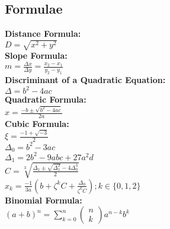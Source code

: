 \documentclass[12pt]{article}
\begin{document}
\subsection*{Formulae}
\textbf{Distance Formula:}
    \\ \( D = \sqrt{ x^2 + y^2 } \)
\\ \textbf{Slope Formula:}
    \\ \( m = \displaystyle\frac{ \Delta x }{ \Delta y } = \displaystyle\frac{ x_2 - x_1 }{ y_2 - y_1 } \)
\\ \textbf{Discriminant of a Quadratic Equation:}
    \\ \( \Delta = b^2 - 4ac \)
\\ \textbf{Quadratic Formula:}
    \\ \( x = \displaystyle\frac{ -b \pm \sqrt{ b^2 - 4ac } }{ 2a } \)
\\ \textbf{Cubic Formula:}
    \\ \( \xi = \displaystyle\frac{ -1 + \sqrt{ -3 } }{ 2 } \)
    \\ \( \Delta_0 = b^2 - 3ac  \)
    \\ \( \Delta_1 = 2b^2 - 9abc + 27 a^2 d \)
    \\ \( C = \sqrt[3]{ \displaystyle\frac{ \Delta_1 \pm \sqrt{ \Delta_1^2 } -4 \Delta_0^3 }{ 2 } } \)
    \\ \( x_k = \displaystyle\frac{ -1 }{ 3a } \left(  b + \zeta^kC + \displaystyle\frac{ \Delta_0 }{ \zeta^k C } \right) ; k \in \{ 0, 1, 2 \} \)
\\ \textbf{Binomial Formula:}
    \\ \( ( a + b )^n = \displaystyle\sum_{k = 0}^{n} { \left( \substack{ n \\ k } \right) a^{n - k} b^k } \)
\end{document}

